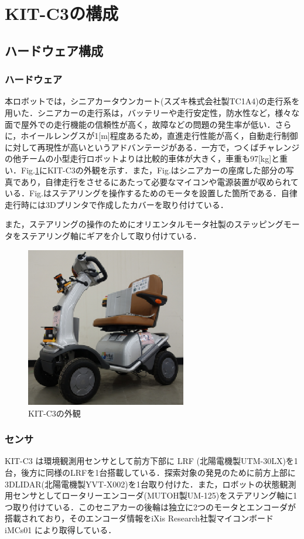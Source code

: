 \documentclass[10pt,a4paper]{jarticle}
\begin{document}
\section{KIT-C3の構成}
\subsection{ハードウェア構成}
\subsubsection{ハードウェア}
本ロボットでは，シニアカータウンカート(スズキ株式会社製TC1A4)の走行系を用いた．シニアカーの走行系は，バッテリーや走行安定性，防水性など，様々な面で屋外での走行機能の信頼性が高く，故障などの問題の発生率が低い．さらに，ホイールレングスが1[m]程度あるため，直進走行性能が高く，自動走行制御に対して再現性が高いというアドバンテージがある．一方で，つくばチャレンジの他チームの小型走行ロボットよりは比較的車体が大きく，車重も97[kg]と重い．Fig.\ref{213021_18Dec14}にKIT-C3の外観を示す．また，Fig.はシニアカーの座席した部分の写真であり，自律走行をさせるにあたって必要なマイコンや電源装置が収められている．Fig.はステアリングを操作するためのモータを設置した箇所である．自律走行時には3Dプリンタで作成したカバーを取り付けている．

また，ステアリングの操作のためにオリエンタルモータ社製のステッピングモータをステアリング軸にギアを介して取り付けている．

\begin{figure}
  \centering
  \includegraphics[width=7cm]{fig/eps/kitc3.eps}
  \caption{KIT-C3の外観}
  \label{213021_18Dec14}
\end{figure}

\subsubsection{センサ}
KIT-C3 は環境観測用センサとして前方下部に LRF (北陽電機製UTM-30LX)を1台，後方に同様のLRFを1台搭載している．探索対象の発見のために前方上部に3DLIDAR(北陽電機製YVT-X002)を1台取り付けた．また，ロボットの状態観測用センサとしてロータリーエンコーダ(MUTOH製UM-125)をステアリング軸に1つ取り付けている．このセニアカーの後輪は独立に2つのモータとエンコーダが搭載されており，そのエンコーダ情報をiXis Research社製マイコンボード iMCs01 により取得している．
\end{document}
